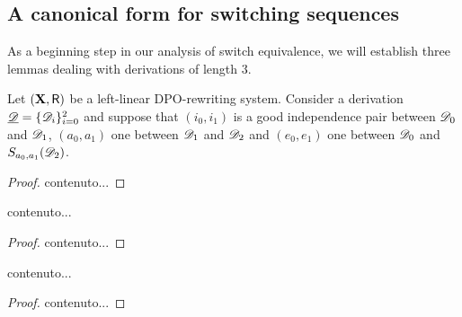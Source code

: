
\subsection{A canonical form for switching sequences} 

As a beginning step in our analysis of switch equivalence, we will establish three lemmas  dealing with derivations of length $3$. 


\begin{lemma}\label{lem:primo}
Let $(\textbf {\textup{X}},\mathsf{R})$ be a left-linear DPO-rewriting system. Consider a derivation $\underline{\mathscr{D}}=\{\mathscr{D}_i\}_{i=0}^2$ and suppose that $(i_0,i_1)$ is a good independence pair between $\mathscr{D}_0$ and $\mathscr{D}_1$, $(a_0,a_1)$ one between $\mathscr{D}_1$ and $\mathscr{D}_2$ and $(e_0, e_1)$ one between $\mathscr{D}_0$ and $S_{a_0,a_1}(\mathscr{D}_2)$.
\end{lemma}
\begin{proof}
	contenuto...
\end{proof}


\begin{lemma}\label{lem:secondo}
	contenuto...
\end{lemma}
\begin{proof}
	contenuto...
\end{proof}



\begin{lemma}\label{lem:terzo}
	contenuto...
\end{lemma}
\begin{proof}
	contenuto...
\end{proof}



